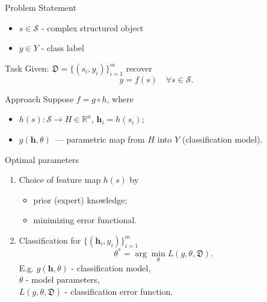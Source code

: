 \documentclass{beamer}
\begin{document}
\begin{frame}{Problem Statement}
	\begin{itemize}
		\item $s \in \mathcal{S}$ - complex structured object
		\item $y \in Y$ - class label
	\end{itemize}
	\begin{block}{Task}
	Given: $\mathfrak{D} = \{(s_i, y_i)\}_{i=1}^m$ recover
	\[
		y = f(s) \quad \forall s \in \mathcal{S}.
	\]
	\end{block}
	\begin{block}{Approach}
		Suppose $f = g \circ h$, where
		\begin{itemize}
			\item $h(s): \mathcal{S} \rightarrow H \in \mathbb{R}^n$,  $\mathbf{h}_i = h(s_i)$;
			\item $g(\mathbf{h}, \theta)$~--- parametric map from $H$ into $Y$ (classification model).
		\end{itemize}
	\end{block}
\end{frame}
\begin{frame}{Optimal parameters}
	\begin{enumerate}
		\item Choice of feature map $h(s)$ by 
		\begin{itemize}
			\item prior (expert) knowledge;
			\item minimizing error functional.
		\end{itemize}
		
		\item Classification for $\{(\mathbf{h}_i , y_i)\}_{i=1}^m$
		\[
			\mathbb{\theta}^* = \arg \min_{\theta} L(g, \theta, \mathfrak{D}).
		\]
		E.g. 
			$g(\mathbf{h}, \theta)$ - classification model, \\ \hspace{0.7cm}
			$\theta$ - model parameters, \\ \hspace{0.7cm}
			$L (g, \theta, \mathfrak{D})$ - classification error function.
		
	\end{enumerate}

\end{frame}
\end{document}
